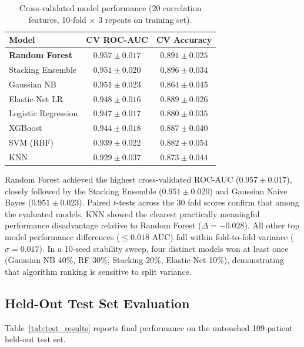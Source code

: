 \documentclass[10pt,twocolumn,a4paper]{article}
\begin{document}
\begin{table}[t]
\centering
\caption{Cross-validated model performance (20 correlation features, 10-fold $\times$ 3 repeats on training set).}
\label{tab:cv_results}
\setlength{\tabcolsep}{4pt}
\small
\begin{tabular}{@{}l c c@{}}
\toprule
Model & CV ROC-AUC & CV Accuracy \\
\midrule
\textbf{Random Forest}  & $\mathbf{0.957 \pm 0.017}$ & $0.891 \pm 0.025$ \\
Stacking Ensemble       & $0.951 \pm 0.020$           & $0.896 \pm 0.034$ \\
Gaussian NB             & $0.951 \pm 0.023$           & $0.864 \pm 0.045$ \\
Elastic-Net LR          & $0.948 \pm 0.016$           & $0.889 \pm 0.026$ \\
Logistic Regression     & $0.947 \pm 0.017$           & $0.880 \pm 0.035$ \\
XGBoost                 & $0.944 \pm 0.018$           & $0.887 \pm 0.040$ \\
SVM (RBF)               & $0.939 \pm 0.022$           & $0.882 \pm 0.054$ \\
KNN                     & $0.929 \pm 0.037$           & $0.873 \pm 0.044$ \\
\bottomrule
\end{tabular}
\end{table}

Random Forest achieved the highest cross-validated ROC-AUC ($0.957 \pm 0.017$), closely followed by the Stacking Ensemble ($0.951 \pm 0.020$)
and Gaussian Naive Bayes ($0.951 \pm 0.023$).  Paired $t$-tests across the 30 fold scores confirm that among the evaluated models, KNN showed
the clearest practically meaningful performance disadvantage relative to Random Forest ($\Delta = -0.028$).
All other top model performance differences ($\le 0.018$ AUC) fall within fold-to-fold variance ($\sigma = 0.017$).
In a 10-seed stability sweep, four distinct models won at least once (Gaussian NB 40\%, RF 30\%, Stacking 20\%, Elastic-Net 10\%),
demonstrating that algorithm ranking is sensitive to split variance.

\subsection{Held-Out Test Set Evaluation}
Table~\ref{tab:test_results} reports final performance on the untouched 109-patient held-out test set.
\end{document}
